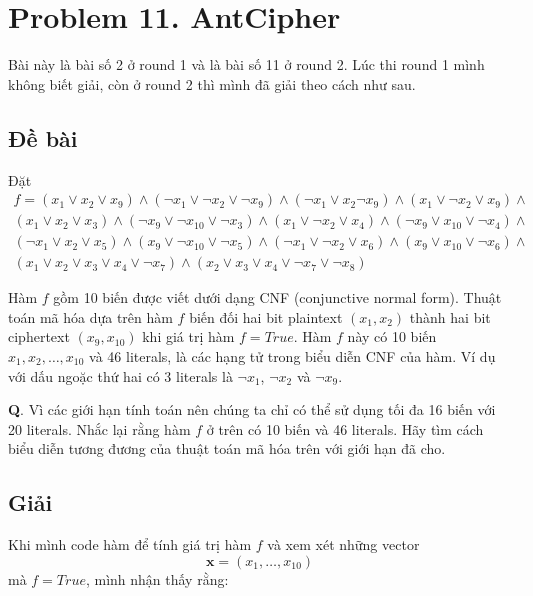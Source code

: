 \section*{Problem 11. AntCipher}

Bài này là bài số 2 ở round 1 và là bài số 11 ở round 2. Lúc thi round 1 mình không biết giải, còn ở round 2 thì mình đã giải theo cách như sau.

\subsection*{Đề bài}

Đặt
\begin{align*}
    f = (x_1 \lor x_2 \lor x_9) \land (\lnot x_1 \lor \lnot x_2 \lor \lnot x_9) \land (\lnot x_1 \lor x_2 \lnot x_9) \land (x_1 \lor \lnot x_2 \lor x_9) \land \\
    (x_1 \lor x_2 \lor x_3) \land (\lnot x_9 \lor \lnot x_{10} \lor \lnot x_3) \land (x_1 \lor \lnot x_2 \lor x_4) \land (\lnot x_9 \lor x_{10} \lor \lnot x_4) \land \\
    (\lnot x_1 \lor x_2 \lor x_5) \land (x_9 \lor \lnot x_{10} \lor \lnot x_5) \land (\lnot x_1 \lor \lnot x_2 \lor x_6) \land (x_9 \lor x_{10} \lor \lnot x_6) \land \\
    (x_1 \lor x_2 \lor x_3 \lor x_4 \lor \lnot x_7) \land (x_2 \lor x_3 \lor x_4 \lor \lnot x_7 \lor \lnot x_8)
\end{align*}

Hàm $f$ gồm 10 biến được viết dưới dạng CNF (conjunctive normal form). Thuật toán mã hóa dựa trên hàm $f$ biến đối hai bit plaintext $(x_1, x_2)$ thành hai bit ciphertext $(x_9, x_{10})$ khi giá trị hàm $f = True$. Hàm $f$ này có 10 biến $x_1, x_2, \ldots, x_{10}$ và 46 literals, là các hạng tử trong biểu diễn CNF của hàm. Ví dụ với dấu ngoặc thứ hai có 3 literals là $\lnot x_1$, $\lnot x_2$ và $\lnot x_9$.

\textbf{Q}. Vì các giới hạn tính toán nên chúng ta chỉ có thể sử dụng tối đa 16 biến với 20 literals. Nhắc lại rằng hàm $f$ ở trên có 10 biến và 46 literals. Hãy tìm cách biểu diễn tương đương của thuật toán mã hóa trên với giới hạn đã cho.

\subsection*{Giải}

Khi mình code hàm để tính giá trị hàm $f$ và xem xét những vector \[ \bm{x} = (x_1, \ldots, x_{10}) \] mà $f = True$, mình nhận thấy rằng:


